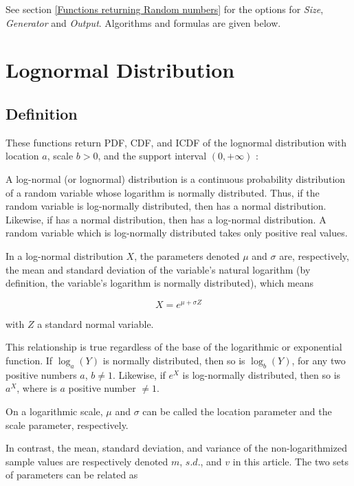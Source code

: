 \vspace{0.3cm}

See section \ref{Functions returning Random numbers} for the options for  {\itshape\sffamily Size},  {\itshape\sffamily Generator} and {\itshape\sffamily Output}. Algorithms and formulas are given below.



\newpage
\section{Lognormal Distribution}
\label{LognormalDistribution}


\subsection{Definition}
\label{LognormalDistributionDefinition}


These functions return PDF, CDF, and ICDF of the lognormal distribution with location
$a$, scale $b > 0$, and the support interval $(0,+\infty)$ :


A log-normal (or lognormal) distribution is a continuous probability distribution of a random variable whose logarithm is normally distributed. Thus, if the random variable  is log-normally distributed, then  has a normal distribution. Likewise, if  has a normal distribution, then  has a log-normal distribution. A random variable which is log-normally distributed takes only positive real values.

In a log-normal distribution $X$, the parameters denoted $\mu$ and $\sigma$ are, respectively, the mean and standard deviation of the variable's natural logarithm (by definition, the variable's logarithm is normally distributed), which means

\begin{equation}
	X = e^{\mu+\sigma Z}
\end{equation}

with $Z$ a standard normal variable.

This relationship is true regardless of the base of the logarithmic or exponential function. If $\log_a(Y)$ is normally distributed, then so is $\log_b(Y)$, for any two positive numbers $a$, $b \neq 1$. Likewise, if $e^X$ is log-normally distributed, then so is $a^X$, where  is $a$ positive number $\neq 1$.

On a logarithmic scale, $\mu$ and $\sigma$ can be called the location parameter and the scale parameter, respectively.

In contrast, the mean, standard deviation, and variance of the non-logarithmized sample values are respectively denoted $m$, $s.d$., and $v$ in this article. The two sets of parameters can be related as

